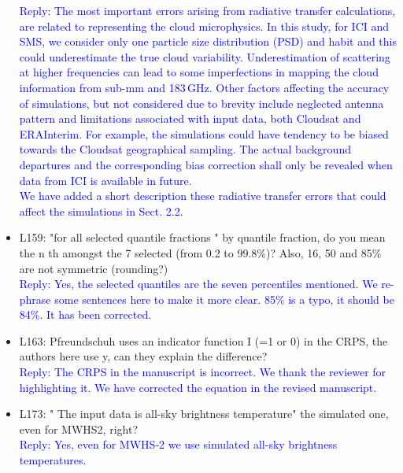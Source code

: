 \documentclass[11pt,a4paper,draft]{article}
\begin{document}
\begin{itemize}
\textcolor{blue}{Reply: The most important errors arising from radiative transfer calculations, are related to representing the cloud microphysics. In this study, for ICI and SMS, we consider only one particle size distribution (PSD) and habit and this could underestimate the true cloud variability. Underestimation of scattering at higher frequencies can lead to some imperfections in mapping the cloud information from sub-mm and 183\,GHz. Other factors affecting the accuracy of simulations, but not considered due to brevity include neglected antenna pattern and limitations associated with input data, both Cloudsat and ERAInterim. For example, the simulations could have tendency to be biased towards the Cloudsat geographical sampling. The actual background departures and the corresponding bias correction shall only be revealed when data from ICI is available in future.\\
We have added a short description these radiative transfer errors that could affect the simulations in Sect. 2.2.  } \\
		
	
		
\item	
		L159: "for all selected quantile fractions " by quantile fraction, do you mean the n th
		amongst the 7 selected (from 0.2 to 99.8\%)? Also, 16, 50 and 85\% are not symmetric
		(rounding?)\\
		
\textcolor{blue}{Reply: Yes, the selected quantiles are the seven percentiles mentioned. We re-phrase some sentences here to make it more clear. 85\% is a typo, it should be 84\%. It has been corrected.}\\
		
		
\item	
		L163: Pfreundschuh uses an indicator function I (=1 or 0) in the CRPS, the authors
		here use y, can they explain the difference?\\
		
\textcolor{blue}{Reply: The CRPS in the manuscript is incorrect. We thank the reviewer for highlighting it. We have corrected the equation in the revised manuscript.}\\
		
		
\item	
		L173: " The input data is all-sky brightness temperature" the simulated one, even for
		MWHS2, right? \\
		
\textcolor{blue}{Reply: Yes, even for MWHS-2 we use simulated all-sky brightness temperatures.}\\
		

\end{itemize}
\end{document}
